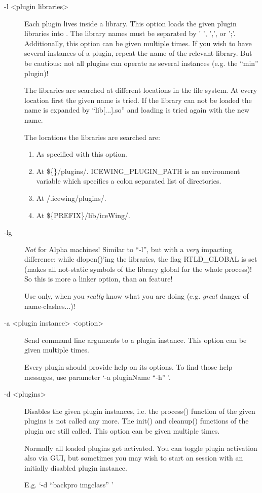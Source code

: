 \begin{description}

\item[-l \textless{}plugin libraries\textgreater{}]
  \label{page:opt_l_libs}
  \label{para:libload} Each plugin lives inside a library. This
  option loads the given plugin libraries into \icewing{}. The
  library names must be separated by ' ', ',', or ';'. Additionally,
  this option can be given multiple times. If you wish to have
  several instances of a plugin, repeat the name of the relevant
  library. But be cautious: not all plugins can operate as several
  instances (e.g. the ``min'' plugin)!

  The libraries are searched at different locations in the file
  system. At every location first the given name is tried. If the
  library can not be loaded the name is expanded by ``lib[...].so''
  and loading is tried again with the new name.

  The locations the libraries are searched are:
  \begin{enumerate}
    \item As specified with this option.
    \item At \$\{\}/plugins/.
      ICEWING\_PLUGIN\_PATH is an environment variable which
      specifies a colon separated list of directories.
    \item At \urltilde{}/.icewing/plugins/.
    \item At \$\{PREFIX\}/lib/iceWing/.
  \end{enumerate}

\item[-lg] \emph{Not} for Alpha machines! Similar to ``-l'', but
  with a {\em very} impacting difference: while dlopen()'ing the
  libraries, the flag RTLD\_GLOBAL is set (makes all not-static
  symbols of the library global for the whole \icewing{} process)!
  So this is more a linker option, than an \icewing{} feature!

  Use only, when you {\em really} know what you are doing (e.g. {\em
  great} danger of name-clashes...)!

\item[-a \textless{}plugin instance\textgreater{} \textless{}option\textgreater{}]
  Send command line arguments to a plugin instance. This option can
  be given multiple times.

  Every plugin should provide help on its options. To find those
  help messages, use parameter `-a pluginName ``-h'' '.

\item[-d \textless{}plugins\textgreater{}]
  Disables the given plugin instances, i.e. the process() function
  of the given plugins is not called any more. The init() and
  cleanup() functions of the plugin are still called. This option
  can be given multiple times.

  Normally all loaded plugins get activated. You can toggle plugin
  activation also via GUI, but sometimes you may wish to start an
  \icewing{} session with an initially disabled plugin instance.

  E.g. `-d ``backpro imgclass'' '

\end{description}

